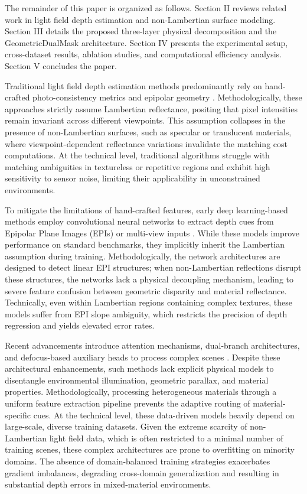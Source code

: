 \documentclass[lettersize,journal]{IEEEtran}
\begin{document}
The remainder of this paper is organized as follows. Section II reviews related work in light field depth estimation and non-Lambertian surface modeling. Section III details the proposed three-layer physical decomposition and the GeometricDualMask architecture. Section IV presents the experimental setup, cross-dataset results, ablation studies, and computational efficiency analysis. Section V concludes the paper.

Traditional light field depth estimation methods predominantly rely on hand-crafted photo-consistency metrics and epipolar geometry . Methodologically, these approaches strictly assume Lambertian reflectance, positing that pixel intensities remain invariant across different viewpoints. This assumption collapses in the presence of non-Lambertian surfaces, such as specular or translucent materials, where viewpoint-dependent reflectance variations invalidate the matching cost computations. At the technical level, traditional algorithms struggle with matching ambiguities in textureless or repetitive regions and exhibit high sensitivity to sensor noise, limiting their applicability in unconstrained environments.

To mitigate the limitations of hand-crafted features, early deep learning-based methods employ convolutional neural networks to extract depth cues from Epipolar Plane Images (EPIs) or multi-view inputs . While these models improve performance on standard benchmarks, they implicitly inherit the Lambertian assumption during training. Methodologically, the network architectures are designed to detect linear EPI structures; when non-Lambertian reflections disrupt these structures, the networks lack a physical decoupling mechanism, leading to severe feature confusion between geometric disparity and material reflectance. Technically, even within Lambertian regions containing complex textures, these models suffer from EPI slope ambiguity, which restricts the precision of depth regression and yields elevated error rates.

Recent advancements introduce attention mechanisms, dual-branch architectures, and defocus-based auxiliary heads to process complex scenes . Despite these architectural enhancements, such methods lack explicit physical models to disentangle environmental illumination, geometric parallax, and material properties. Methodologically, processing heterogeneous materials through a uniform feature extraction pipeline prevents the adaptive routing of material-specific cues. At the technical level, these data-driven models heavily depend on large-scale, diverse training datasets. Given the extreme scarcity of non-Lambertian light field data, which is often restricted to a minimal number of training scenes, these complex architectures are prone to overfitting on minority domains. The absence of domain-balanced training strategies exacerbates gradient imbalances, degrading cross-domain generalization and resulting in substantial depth errors in mixed-material environments.
\end{document}
